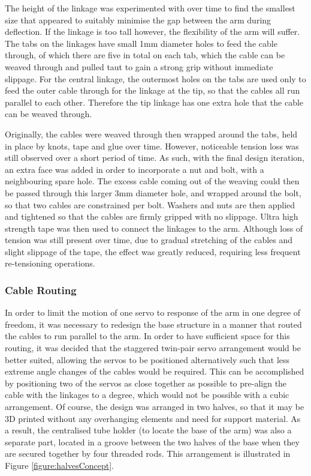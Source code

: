 \documentclass[11pt]{article}
\begin{document}
The height of the linkage was experimented with over time to find the smallest size that appeared to suitably minimise the gap between the arm during deflection. If the linkage is too tall however, the flexibility of the arm will suffer. The tabs on the linkages have small 1mm diameter holes to feed the cable through, of which there are five in total on each tab, which the cable can be weaved through and pulled taut to gain a strong grip without immediate slippage. For the central linkage, the outermost holes on the tabs are used only to feed the outer cable through for the linkage at the tip, so that the cables all run parallel to each other. Therefore the tip linkage has one extra hole that the cable can be weaved through. 

Originally, the cables were weaved through then wrapped around the tabs, held in place by knots, tape and glue over time. However, noticeable tension loss was still observed over a short period of time. As such, with the final design iteration, an extra face was added in order to incorporate a nut and bolt, with a neighbouring spare hole. The excess cable coming out of the weaving could then be passed through this larger 3mm diameter hole, and wrapped around the bolt, so that two cables are constrained per bolt. Washers and nuts are then applied and tightened so that the cables are firmly gripped with no slippage. Ultra high strength tape was then used to connect the linkages to the arm. Although loss of tension was still present over time, due to gradual stretching of the cables and slight slippage of the tape, the effect was greatly reduced, requiring less frequent re-tensioning operations.

\subsubsection{Cable Routing}
\label{section:cableRouting}

In order to limit the motion of one servo to response of the arm in one degree of freedom, it was necessary to redesign the base structure in a manner that routed the cables to run parallel to the arm. In order to have sufficient space for this routing, it was decided that the staggered twin-pair servo arrangement would be better suited, allowing the servos to be positioned alternatively such that less extreme angle changes of the cables would be required. This can be accomplished by positioning two of the servos as close together as possible to pre-align the cable with the linkages to a degree, which would not be possible with a cubic arrangement. Of course, the design was arranged in two halves, so that it may be 3D printed without any overhanging elements and need for support material. As a result, the centralised tube holder (to locate the base of the arm) was also a separate part, located in a groove between the two halves of the base when they are secured together by four threaded rods. This arrangement is illustrated in Figure \ref{figure:halvesConcept}.
\end{document}
